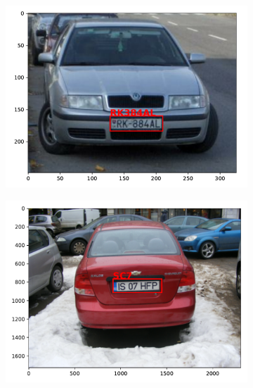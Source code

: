 \begin{figure}
\begin{subfigure}{0.31\textwidth}
    \end{subfigure}
    \begin{subfigure}{0.31\textwidth}
        \includegraphics[width=\textwidth]{abbildungen/prediction_03.pdf}
    \end{subfigure}
    \begin{subfigure}{0.31\textwidth}
        \includegraphics[width=\textwidth]{abbildungen/prediction_04.pdf}
    \end{subfigure}
    \begin{subfigure}{0.31\textwidth}

\end{subfigure}
\end{figure}
